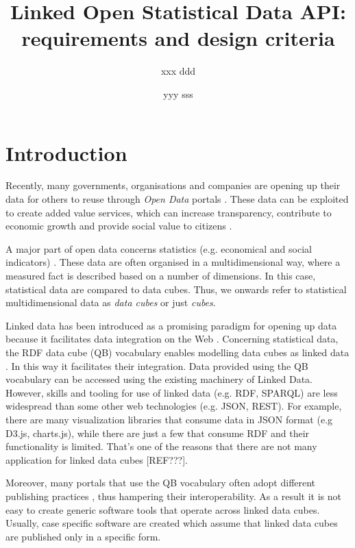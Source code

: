 \documentclass{llncs}
\begin{document}
\title{Linked Open Statistical Data API: requirements and design criteria}

\author{xxx ddd \and yyy sss}

\maketitle

\begin{abstract}

\end{abstract}

\section{Introduction}\label{sec:intro}

Recently, many governments, organisations and companies are opening up their data for others to reuse through \textit{Open Data} portals  \cite{Kalampokis:2011:IJWET}. These data can be exploited to create added value services, which can increase transparency, contribute to economic growth and provide social value to citizens \cite{Janssen:2012}.

A major part of open data concerns statistics (e.g. economical and social indicators) \cite{Capadisli:2013}. These data are often organised in a multidimensional way, where a measured fact is described based on a number of dimensions. In this case, statistical data are compared to data cubes. Thus, we onwards refer to statistical multidimensional data as \textit{data cubes} or just \textit{cubes}.

Linked data has been introduced as a promising paradigm for opening up data because it facilitates data integration on the Web \cite{Bizer:2009}. Concerning statistical data, the RDF data cube (QB) vocabulary enables modelling data cubes as linked data \cite{Cyganiak:2014:W3C}. In this way it facilitates their integration. Data provided using the QB vocabulary can be accessed using the existing machinery of Linked Data. However, skills and tooling for use of linked data (e.g. RDF, SPARQL) are less widespread than some other web technologies (e.g. JSON, REST). For example, there are many visualization libraries that consume data in JSON format (e.g D3.js, charts.js), while there are just a few that consume RDF and their functionality is limited. That's one of the reasons that there are not many application for linked data cubes [REF???].

Moreover, many portals that use the QB vocabulary often adopt different publishing practices \cite{KalampokisChallenges}, thus hampering their interoperability. As a result it is not easy to create generic software tools that operate across linked data cubes. Usually, case specific software are created which assume that linked data cubes are published only in a specific form. 
\end{document}

